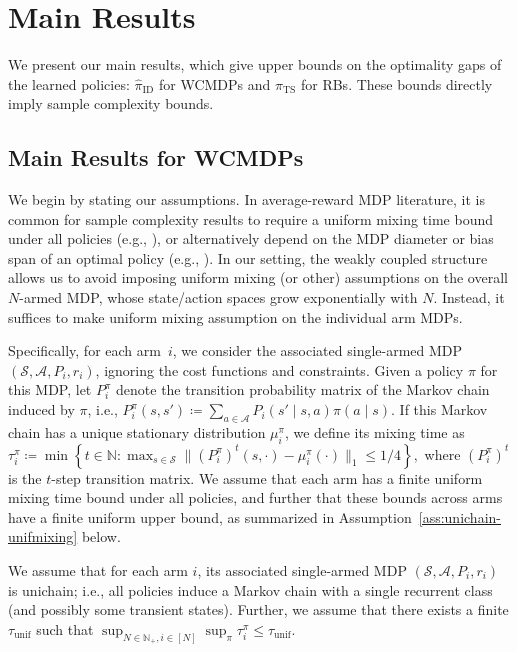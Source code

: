 \documentclass[mnsc,nonblindrev]{informs3}
\newcommand{\pihid}{\widehat{\pi}_{\mathrm{ID}}}
\newcommand{\pihts}{\widehat{\pi}_{\mathrm{TS}}}
\newcommand{\tmix}{\tau_{\mathrm{unif}}}
\newcommand{\States}{\mathcal{S}}
\newcommand{\Actions}{\mathcal{A}}
\begin{document}
\section{Main Results}
We present our main results, which give upper bounds on the optimality gaps of the learned policies: $\pihid$ for WCMDPs and $\pihts$ for RBs.
These bounds directly imply sample complexity bounds.

\subsection{Main Results for WCMDPs}
We begin by stating our assumptions.
In average-reward MDP literature, it is common for sample complexity results to require a uniform mixing time bound under all policies (e.g., \citealt{jin_efficiently_2020, jin_towards_2021, wang_optimal_2023, li_stochastic_2024}), or alternatively depend on the MDP diameter or bias span of an optimal policy (e.g., \citealt{zurek_span-based_2025, zurek_plug-approach_2024, tuynman_finding_2024}).
In our setting, the weakly coupled structure allows us to avoid imposing uniform mixing (or other) assumptions on the overall $N$-armed MDP, whose state/action spaces grow exponentially with $N$.
Instead, it suffices to make uniform mixing assumption on the individual arm MDPs.


Specifically, for each arm~$i$, we consider the associated single-armed MDP $(\States, \Actions, P_i, r_i)$, ignoring the cost functions and constraints.
Given a policy $\pi$ for this MDP, let $P^\pi_i$ denote the transition probability matrix of the Markov chain induced by $\pi$, i.e., $P^\pi_i(s,s') \coloneqq \sum_{a\in\mathcal{A}} P_i(s'\mid s,a)\pi(a\mid s).$
If this Markov chain has a unique stationary distribution $\mu^\pi_i$, we define its mixing time as
$\tau^\pi_i\coloneqq\min\left\{ t\in\mathbb{N}\colon
\max_{s\in\mathcal{S}}\bigl\| (P^\pi_i)^{t}(s,\cdot)-\mu^\pi_i(\cdot)\bigr\|_1 \le 1/4 \right\},$
where $(P^\pi_i)^{t}$ is the $t$-step transition matrix.
We assume that each arm has a finite uniform mixing time bound under all policies,
and further that these bounds across arms have a finite uniform upper bound, as summarized in Assumption~\ref{ass:unichain-unifmixing} below.
\begin{assumption}\label{ass:unichain-unifmixing}
We assume that for each arm $i$, its associated single-armed MDP $(\States, \Actions, P_i, r_i)$ is unichain; i.e., all policies induce a Markov chain with a single recurrent class (and possibly some transient states).
Further, we assume that there exists a finite \(\tmix\) such that $\sup_{N\in\mathbb{N}_+,i\in[N]}\sup_{\pi}\tau^\pi_i\le \tmix$.
\end{assumption}
\end{document}
